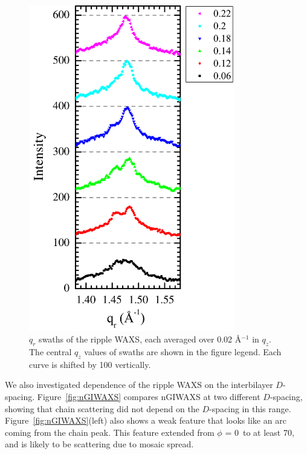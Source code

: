 \begin{figure}[htbp]
  \centering
  \includegraphics[width=0.8\textwidth]{figures/ripple/nGIWAXS/qrplots}
  \caption{$q_r$ swaths of the ripple WAXS, each averaged over 0.02 \AA$^{-1}$
  in $q_z$. 
  The central $q_z$ values of swaths are shown in the figure legend.  
  Each curve is shifted by 100 vertically. }
  \label{fig:qrplots}
\end{figure}

We also investigated dependence of the ripple WAXS on the interbilayer
$D$-spacing. Figure~\ref{fig:nGIWAXS} compares nGIWAXS at two different $D$-spacing,
showing that chain scattering did not depend on the $D$-spacing in this range. 
Figure~\ref{fig:nGIWAXS}(left) also shows a weak feature that looks like an 
arc coming from the chain peak. This feature extended
from $\phi$ = 0\textdegree\ to at least 70\textdegree, and
is likely to be scattering due to mosaic spread.

